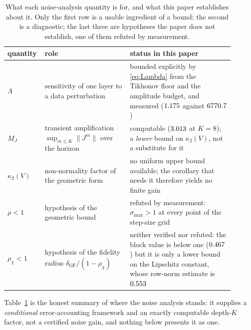 \documentclass[journal,cmes,article,submit,moreauthors,pdftex]{Definitions/tsp}
\newcommand{\norm}[1]{\lVert #1 \rVert}
\newcommand{\numv}[1]{#1}
\begin{document}
\begin{table}[htbp]
\centering
\caption{What each noise-analysis quantity is for, and what this paper establishes about it.
Only the first row is a usable ingredient of a bound; the second is a diagnostic; the last three
are hypotheses the paper does not establish, one of them refuted by measurement.}
\label{tab:noisestatus}
\small
\begin{tabular}{@{}p{0.10\linewidth}p{0.36\linewidth}p{0.44\linewidth}@{}}
\toprule
quantity & role & status in this paper \\
\midrule
$\Lambda$ & sensitivity of one layer to a data perturbation & bounded explicitly by
\eqref{eq:Lambda} from the Tikhonov floor and the amplitude budget, and measured
($\numv{\NumLambdaMeas}$ against $\numv{\NumLambdaBound}$) \\
$M_J$ & transient amplification $\sup_{m\le K}\norm{J^{m}}$ over the horizon & computable
($\numv{\NumMJCons}$ at $K{=}8$); a \emph{lower} bound on $\kappa_2(V)$, not a substitute for it \\
$\kappa_2(V)$ & non-normality factor of the geometric form & no uniform upper bound available;
the corollary that needs it therefore yields no finite gain \\
$\rho<1$ & hypothesis of the geometric bound & refuted by measurement: $\sigma_{\max}>1$ at every
point of the step-size grid \\
$\rho_\chi<1$ & hypothesis of the fidelity radius $\delta_{\mathrm{GF}}/(1-\rho_\chi)$ & neither
verified nor refuted: the block value is below one ($\numv{\NumRhoChiCons}$) but it is only a lower
bound on the Lipschitz constant, whose row-norm estimate is $\numv{\NumChiLipRowCons}$ \\
\bottomrule
\end{tabular}
\end{table}
Table~\ref{tab:noisestatus} is the honest summary of where the noise analysis stands: it supplies a
\emph{conditional} error-accounting framework and an exactly computable depth-$K$ factor, not a
certified noise gain, and nothing below presents it as one.
\end{document}

